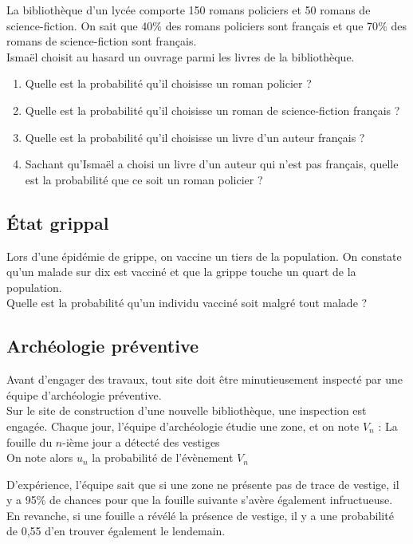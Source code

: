 \documentclass[oneside,12pt]{article}          %
\begin{document}
La bibliothèque d’un lycée comporte 150 romans policiers et 50 romans de science-fiction.
On sait que 40$\%$ des romans policiers sont français et que 70$\%$ des romans de science-fiction sont français. \\
Ismaël choisit au hasard un ouvrage parmi les livres de la bibliothèque.
\begin{enumerate}
    \item Quelle est la probabilité qu'il choisisse un roman policier ?
    \item Quelle est la probabilité qu'il choisisse un roman de science-fiction français ?
    \item Quelle est la probabilité qu'il choisisse un livre d'un auteur français ?
    \item Sachant qu'Ismaël a choisi un livre d'un auteur qui n'est pas français, quelle est la probabilité que ce soit un roman policier ?
\end{enumerate}



\subsection{État grippal}
 Lors d'une épidémie de grippe, on vaccine un tiers de la population. On constate qu'un malade sur dix est vacciné et que la grippe touche un quart de la population. \\
Quelle est la probabilité qu'un individu vacciné soit malgré tout malade ?



\subsection{Archéologie préventive}
Avant d'engager des travaux, tout site doit être minutieusement inspecté par une équipe d'archéologie préventive.\\
Sur le site de construction d'une nouvelle bibliothèque, une inspection est engagée. Chaque jour, l'équipe d'archéologie étudie une zone, et on note $V_n$ : \og La fouille du $n$-ième jour a détecté des vestiges\fg\\
On note alors $u_n$ la probabilité de l'évènement $V_n$

D'expérience, l'équipe sait que si une zone ne présente pas de trace de vestige, il  y a 95\% de chances pour que la fouille suivante s'avère également infructueuse. En revanche, si une fouille a révélé la présence de vestige, il y a une probabilité de 0,55 d'en trouver également le lendemain.
\end{document}

